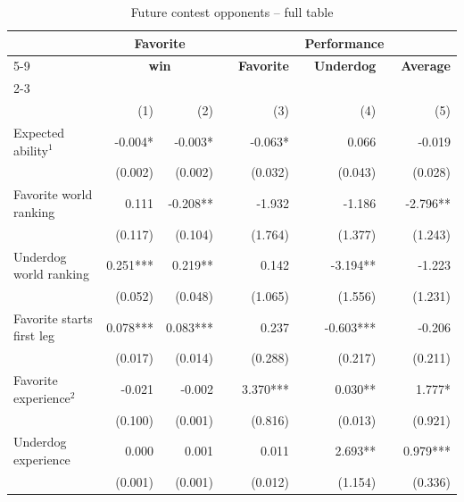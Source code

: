 \documentclass[11pt,a4paper]{article}
\begin{document}
	\begin{table}[H]
		\centering
		\caption{Future contest opponents -- full table} 
		\label{tab:table_app_fut}
		\begin{tabular}{l r r r r r r r r} 
			\toprule \toprule
			& \multicolumn{2}{c}{\textbf{~~~Favorite~~~}} &  &  \multicolumn{5}{c}{\textbf{Performance}}  \\
            \cline{5-9}
   			& \multicolumn{2}{c}{\textbf{win}} &  &  \multicolumn{1}{c}{\textbf{Favorite}} & & \multicolumn{1}{c}{\textbf{Underdog}} & & \multicolumn{1}{c}{\textbf{Average}}\\
            \cline{2-3} \cline{5-5} \cline{7-7} \cline{9-9} \vspace{0.1em}\\
			\textbf{}                  & (1)       &  (2)        & & (3)        & & (4)        & & (5)     \\ 
			\midrule
			Expected ability$^1$       & -0.004*   & -0.003*     & &  -0.063*   & &   0.066    & & -0.019   \\
			                           & (0.002)   & (0.002)     & &  (0.032)   & &  (0.043)   & & (0.028)  \\
			Favorite world ranking     &  0.111    & -0.208**    & &  -1.932    & & -1.186     & & -2.796** \\
			                           &  (0.117)  & (0.104)     & &  (1.764)   & &  (1.377)   & & (1.243)  \\
			Underdog world ranking     & 0.251***  & 0.219**     & &   0.142    & & -3.194**   & & -1.223   \\
			                           &  (0.052)  & (0.048)     & &  (1.065)   & &  (1.556)   & & (1.231)  \\
			Favorite starts first leg  & 0.078***  & 0.083***    & &   0.237    & &  -0.603*** & & -0.206   \\
			                           &  (0.017)  & (0.014)     & &  (0.288)   & &  (0.217)   & & (0.211)  \\
			Favorite experience$^{2}$  &  -0.021   & -0.002      & & 3.370***   & & 0.030**    & & 1.777*   \\
			                           &   (0.100) & (0.001)     & &  (0.816)   & &  (0.013)   & & (0.921)  \\
			Underdog experience        &   0.000   & 0.001       & &   0.011    & &  2.693**   & & 0.979*** \\
			                           &  (0.001)  & (0.001)     & &  (0.012)   & &  (1.154)   & & (0.336)  \\

\end{tabular}
\end{table}
\end{document}
